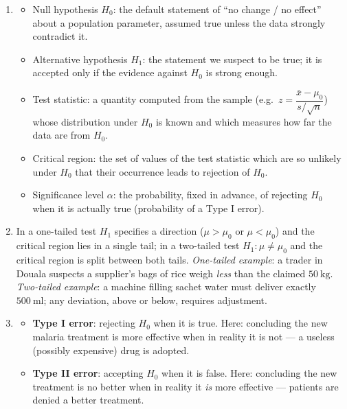 \documentclass[11pt]{article}
\newcommand{\cle}[1]{{\popxbold\color{popdark}#1}}
\begin{document}
\begin{corrige}
\begin{enumerate}
\item \begin{itemize}
\item \cle{Null hypothesis} $H_0$: the default statement of ``no change / no effect'' about a population parameter, assumed true unless the data strongly contradict it.
\item \cle{Alternative hypothesis} $H_1$: the statement we suspect to be true; it is accepted only if the evidence against $H_0$ is strong enough.
\item \cle{Test statistic}: a quantity computed from the sample (e.g.\ $z = \dfrac{\bar{x}-\mu_0}{s/\sqrt{n}}$) whose distribution under $H_0$ is known and which measures how far the data are from $H_0$.
\item \cle{Critical region}: the set of values of the test statistic which are so unlikely under $H_0$ that their occurrence leads to rejection of $H_0$.
\item \cle{Significance level} $\alpha$: the probability, fixed in advance, of rejecting $H_0$ when it is actually true (probability of a Type I error).
\end{itemize}
\item In a \cle{one-tailed} test $H_1$ specifies a direction ($\mu > \mu_0$ or $\mu < \mu_0$) and the critical region lies in a single tail; in a \cle{two-tailed} test $H_1: \mu \neq \mu_0$ and the critical region is split between both tails. \emph{One-tailed example}: a trader in Douala suspects a supplier's bags of rice weigh \emph{less} than the claimed $50\ \mathrm{kg}$. \emph{Two-tailed example}: a machine filling sachet water must deliver exactly $500\ \mathrm{ml}$; any deviation, above or below, requires adjustment.
\item \begin{itemize}
\item \textbf{Type I error}: rejecting $H_0$ when it is true. Here: concluding the new malaria treatment is more effective when in reality it is not — a useless (possibly expensive) drug is adopted.
\item \textbf{Type II error}: accepting $H_0$ when it is false. Here: concluding the new treatment is no better when in reality it \emph{is} more effective — patients are denied a better treatment.
\end{itemize}
\end{enumerate}
\end{corrige}
\end{document}

